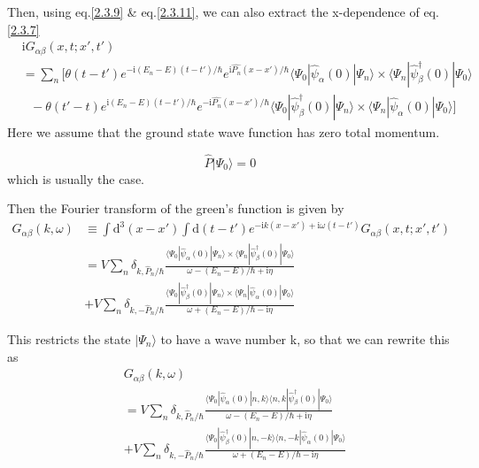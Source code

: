 Then, using eq.\eqref{2.3.9} \& eq.\eqref{2.3.11}, we can also extract the x-dependence of eq.\eqref{2.3.7}
\begin{align}
&\mathrm{i}G_{\alpha\beta}(x,t;x',t') \nonumber \\
&=\sum_n\bigg [\theta(t-t')e^{-\mathrm{i}(E_n-E)(t-t')/\hbar}e^{\mathrm{i}\hat{P_n}(x-x')/\hbar}\langle\Psi_0|\hat \psi_{\alpha}(0)|\Psi_n\rangle\times\langle\Psi_n|\hat \psi^{
\dagger}_{\beta} (0)|\Psi_0\rangle \nonumber \\
& \ \ \ -\theta(t'-t)e^{\mathrm{i}(E_n-E)(t-t')/\hbar}e^{-\mathrm{i}\hat{P_n}(x-x')/\hbar}\langle\Psi_0|\hat \psi^{
\dagger}_{\beta}(0)|\Psi_n\rangle\times\langle\Psi_n|\hat \psi_{\alpha} (0)|\Psi_0\rangle \bigg ] \nonumber
\end{align}
Here we assume that the ground state wave function has zero total momentum.

\begin{equation}
\hat{P}|\Psi_0\rangle=0 \nonumber
\end{equation}
which is usually the case.

Then the Fourier transform of the green's function is given by
\begin{align}
G_{\alpha\beta}(k,\omega)&\equiv\int \mathrm{d}^3(x-x')\int \mathrm{d}(t-t')e^{-\mathrm{i}k(x-x')+\mathrm{i}\omega(t-t')}G_{\alpha\beta}(x,t;x',t') \nonumber \\
&=V\sum_n \delta_{k,\hat P_n/\hbar} \frac{\langle\Psi_0|\hat \psi_{\alpha}(0)|\Psi_n\rangle\times\langle\Psi_n|\hat \psi^{
\dagger}_{\beta} (0)|\Psi_0\rangle}{\omega-(E_n-E)/\hbar +\mathrm{i}\eta}  \nonumber \\
&+V\sum_n \delta_{k,-\hat P_n/\hbar} \frac{\langle\Psi_0|\hat \psi^{
\dagger}_{\beta} (0)|\Psi_n\rangle\times\langle\Psi_n|\hat \psi_{\alpha}(0)|\Psi_0\rangle}{\omega+(E_n-E)/\hbar -\mathrm{i}\eta}  \nonumber
\end{align}

This restricts the state $|\Psi_n\rangle$ to have a wave number k, so that we can rewrite this as
\begin{align}
& G_{\alpha\beta}(k,\omega) \nonumber \\
&=V\sum_n \delta_{k,\hat P_n/\hbar} \frac{\langle\Psi_0|\hat \psi_{\alpha}(0)|n,k\rangle\langle n,k|\hat \psi^{
\dagger}_{\beta} (0)|\Psi_0\rangle}{\omega-(E_n-E)/\hbar +\mathrm{i}\eta}  \nonumber \\
&+V\sum_n \delta_{k,-\hat P_n/\hbar} \frac{\langle\Psi_0|\hat \psi^{
\dagger}_{\beta} (0)|n,-k\rangle\langle n,-k|\hat \psi_{\alpha}(0)|\Psi_0\rangle}{\omega+(E_n-E)/\hbar -\mathrm{i}\eta}  \nonumber
\end{align}

